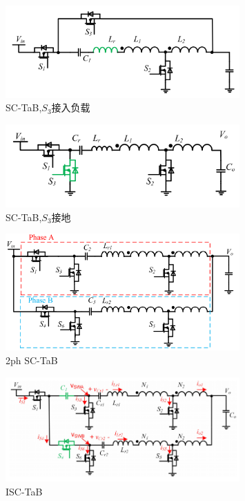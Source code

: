 \begin{figure}[h]
    \centering
    \includegraphics[width = 0.8\textwidth]{figures/SC-TaB1.png}
    \caption{SC-TaB,$S_3$接入负载}
\end{figure}
\begin{figure}[h]
    \centering
    \includegraphics[width = 0.8\textwidth]{figures/SC-TaB.png}
    \caption{SC-TaB,$S_3$接地}
\end{figure}
\begin{figure}[h]
    \centering
    \includegraphics[width = 0.8\textwidth]{figures/2ph SC-TaB.png}
    \caption{2ph SC-TaB}
\end{figure}
\begin{figure}[h]
    \centering
    \includegraphics[width = 0.8\textwidth]{figures/circuit diagram1.png}
    \caption{ISC-TaB}
\end{figure}
